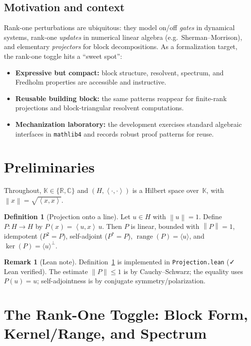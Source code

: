\documentclass[11pt]{article}
\theoremstyle{definition}
\newtheorem{definition}[theorem]{Definition}
\newtheorem{remark}[theorem]{Remark}
\newcommand{\K}{\mathbb{K}}
\newcommand{\R}{\mathbb{R}}
\newcommand{\C}{\mathbb{C}}
\newcommand{\ip}[2]{\left\langle #1,#2\right\rangle}
\newcommand{\norm}[1]{\left\lVert #1\right\rVert}
\DeclareMathOperator{\range}{range}
\DeclareMathOperator{\kerop}{ker}
\newcommand{\leanok}{\textsf{\small \textcolor{green!60!black}{✓ Lean verified}}}
\begin{document}
\subsection*{Motivation and context}
Rank-one perturbations are ubiquitous: they model on/off \emph{gates} in dynamical systems, rank-one \emph{updates} in numerical linear algebra (e.g.\ Sherman--Morrison), and elementary \emph{projectors} for block decompositions. As a formalization target, the rank-one toggle hits a ``sweet spot'':
\begin{itemize}
\item \textbf{Expressive but compact:} block structure, resolvent, spectrum, and Fredholm properties are accessible and instructive.
\item \textbf{Reusable building block:} the same patterns reappear for finite-rank projections and block-triangular resolvent computations.
\item \textbf{Mechanization laboratory:} the development exercises standard algebraic interfaces in \texttt{mathlib4} and records robust proof patterns for reuse.
\end{itemize}

\section{Preliminaries}

Throughout, $\K\in\{\R,\C\}$ and $(H,\ip{\cdot}{\cdot})$ is a Hilbert space over~$\K$, with $\norm{x}=\sqrt{\ip{x}{x}}$.

\begin{definition}[Projection onto a line]\label{def:proj}
Let $u\in H$ with $\norm{u}=1$. Define $P:H\to H$ by $P(x)=\ip{u}{x}\,u$. Then $P$ is linear, bounded with $\norm{P}=1$, idempotent ($P^2=P$), self-adjoint ($P^\ast=P$), $\range(P)=\langle u\rangle$, and $\kerop(P)=\langle u\rangle^\perp$.
\end{definition}

\begin{remark}[Lean note]
Definition~\ref{def:proj} is implemented in \texttt{Projection.lean} (\leanok). The estimate $\lVert P\rVert\le 1$ is by Cauchy--Schwarz; the equality uses $P(u)=u$; self-adjointness is by conjugate symmetry/polarization.
\end{remark}

\section{The Rank-One Toggle: Block Form, Kernel/Range, and Spectrum}\label{sec:toggle}
\end{document}
